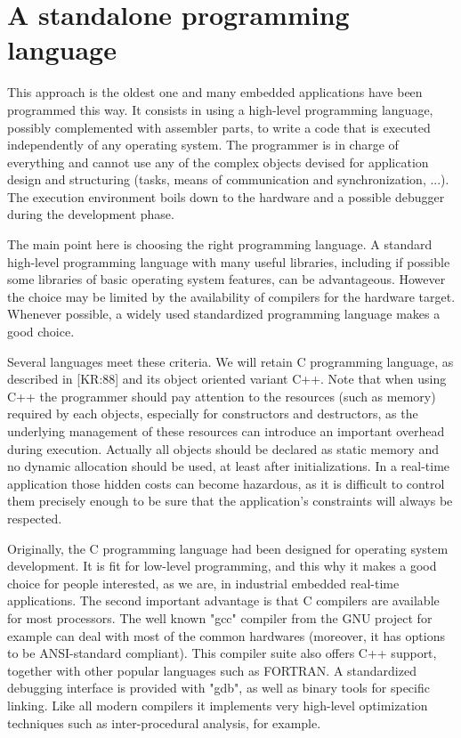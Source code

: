 \documentclass[10pt]{report}
\begin{document}
\section{A standalone programming language}

This approach is the oldest one and many embedded applications
have been programmed this way. It consists in using a high-level
programming language, possibly complemented with assembler parts,
to write a code that is executed independently of any operating
system. The programmer is in charge of everything and cannot use
any of the complex objects devised for application design and
structuring (tasks, means of communication and synchronization,
...). The execution environment boils down to the hardware and a
possible debugger during the development phase.

The main point here is choosing the right programming language. A
standard high-level programming language with many useful
libraries, including if possible some libraries of basic
operating system features, can be advantageous. However the
choice may be limited by the availability of compilers for the
hardware target. Whenever possible, a widely used standardized
programming language makes a good choice.

Several languages meet these criteria. We will retain C
programming language, as described in [KR:88] and its object
oriented variant C++. Note that when using C++ the programmer
should pay attention to the resources (such as memory) required
by each objects, especially for constructors and destructors, as
the underlying management of these resources can introduce an
important overhead during execution. Actually all objects should
be declared as static memory and no dynamic allocation should be
used, at least after initializations. In a real-time application
those hidden costs can become hazardous, as it is difficult to
control them precisely enough to be sure that the application's
constraints will always be respected.

Originally, the C programming language had been designed for
operating system development. It is fit for low-level
programming, and this why it makes a good choice for people
interested, as we are, in industrial embedded real-time
applications. The second important advantage is that C compilers
are available for most processors. The well known "gcc" compiler
from the GNU project for example can deal with most of the common
hardwares (moreover, it has options to be ANSI-standard
compliant). This compiler suite also offers C++ support, together
with other popular languages such as FORTRAN. A standardized
debugging interface is provided with "gdb", as well as binary
tools for specific linking. Like all modern compilers it
implements very high-level optimization techniques such as
inter-procedural analysis, for example.
\end{document}
